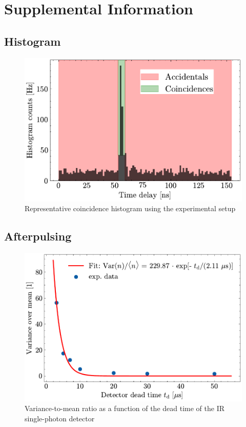 \chapter{Supplemental Information}
\vspace{-0.5em}
\section*{Histogram}
\begin{figure}[h!]
	\centering
	\includegraphics[width=.7\textwidth]{Images/HistogramExample_2.pdf}
	\caption{Representative coincidence histogram using the experimental setup}
	\label{fig:HistExamAcc}
\end{figure}
\vspace{-1.5em}
\section*{Afterpulsing}
\begin{figure}[b!]
	\centering
	\includegraphics[width=.7\textwidth]{Images/VarMean_DeadTime_Afterpulsing_2.pdf}
	\caption{Variance-to-mean ratio as a function of the dead time of the IR single-photon detector}
	\label{fig:VoMDead}
\end{figure}
\newpage
